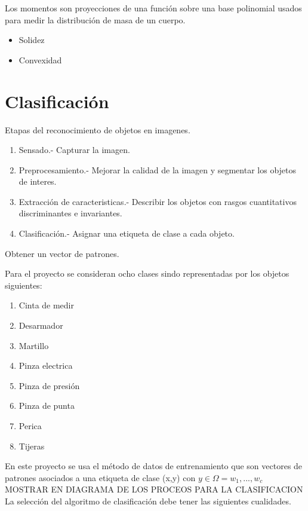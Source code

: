 \documentclass[a4paper, 11pt]{article}
\begin{document}
Los momentos son proyecciones de una función sobre una base polinomial usados para medir la distribución de masa de un cuerpo.

\begin{itemize}
\item Solidez
\item Convexidad
\end{itemize}

\pagebreak
\section{Clasificación}

Etapas del reconocimiento de objetos en imagenes.

\begin{enumerate}
\item Sensado.- Capturar la imagen.
\item Preprocesamiento.- Mejorar la calidad de la imagen y segmentar los objetos de interes.
\item Extracción de caracteristicas.- Describir los objetos con rasgos cuantitativos discriminantes e invariantes.
\item Clasificación.- Asignar una etiqueta de clase a cada objeto.
\end{enumerate}

Obtener un vector de patrones.

Para el proyecto se consideran ocho clases sindo representadas por los objetos siguientes:

\begin{enumerate}
\item Cinta de medir
\item Desarmador
\item Martillo
\item Pinza electrica
\item Pinza de presión
\item Pinza de punta
\item Perica
\item Tijeras
\end{enumerate}

En este proyecto se usa el método de datos de entrenamiento que son vectores de patrones asociados a una etiqueta de clase (x,y) con $y \in \Omega = {w_{1},...,w_{c}}$\\

MOSTRAR EN DIAGRAMA DE LOS PROCEOS PARA LA CLASIFICACION\\

La selección del algoritmo de clasificación debe tener las siguientes cualidades.
\end{document}
